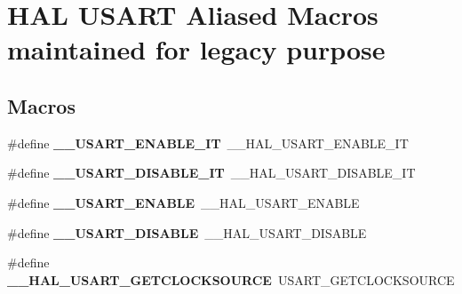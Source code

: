 \hypertarget{group___h_a_l___u_s_a_r_t___aliased___macros}{\section{H\-A\-L U\-S\-A\-R\-T Aliased Macros maintained for legacy purpose}
\label{group___h_a_l___u_s_a_r_t___aliased___macros}
}
\subsection*{Macros}
\begin{DoxyCompactItemize}
\item 
\hypertarget{group___h_a_l___u_s_a_r_t___aliased___macros_gab99081ba6bb70f397ab2def3f644c3c1}{\#define {\bfseries \-\_\-\-\_\-\-U\-S\-A\-R\-T\-\_\-\-E\-N\-A\-B\-L\-E\-\_\-\-I\-T}~\-\_\-\-\_\-\-H\-A\-L\-\_\-\-U\-S\-A\-R\-T\-\_\-\-E\-N\-A\-B\-L\-E\-\_\-\-I\-T}\label{group___h_a_l___u_s_a_r_t___aliased___macros_gab99081ba6bb70f397ab2def3f644c3c1}

\item 
\hypertarget{group___h_a_l___u_s_a_r_t___aliased___macros_ga12ae7c59b7d95f0f8606fca7bba57db8}{\#define {\bfseries \-\_\-\-\_\-\-U\-S\-A\-R\-T\-\_\-\-D\-I\-S\-A\-B\-L\-E\-\_\-\-I\-T}~\-\_\-\-\_\-\-H\-A\-L\-\_\-\-U\-S\-A\-R\-T\-\_\-\-D\-I\-S\-A\-B\-L\-E\-\_\-\-I\-T}\label{group___h_a_l___u_s_a_r_t___aliased___macros_ga12ae7c59b7d95f0f8606fca7bba57db8}

\item 
\hypertarget{group___h_a_l___u_s_a_r_t___aliased___macros_gae03c01e0ee50608e887842bacbf5b361}{\#define {\bfseries \-\_\-\-\_\-\-U\-S\-A\-R\-T\-\_\-\-E\-N\-A\-B\-L\-E}~\-\_\-\-\_\-\-H\-A\-L\-\_\-\-U\-S\-A\-R\-T\-\_\-\-E\-N\-A\-B\-L\-E}\label{group___h_a_l___u_s_a_r_t___aliased___macros_gae03c01e0ee50608e887842bacbf5b361}

\item 
\hypertarget{group___h_a_l___u_s_a_r_t___aliased___macros_gac894c090835b348469f36bfed6e78fbd}{\#define {\bfseries \-\_\-\-\_\-\-U\-S\-A\-R\-T\-\_\-\-D\-I\-S\-A\-B\-L\-E}~\-\_\-\-\_\-\-H\-A\-L\-\_\-\-U\-S\-A\-R\-T\-\_\-\-D\-I\-S\-A\-B\-L\-E}\label{group___h_a_l___u_s_a_r_t___aliased___macros_gac894c090835b348469f36bfed6e78fbd}

\item 
\hypertarget{group___h_a_l___u_s_a_r_t___aliased___macros_ga0ed768f9a18f877413306078c442a2a5}{\#define {\bfseries \-\_\-\-\_\-\-H\-A\-L\-\_\-\-U\-S\-A\-R\-T\-\_\-\-G\-E\-T\-C\-L\-O\-C\-K\-S\-O\-U\-R\-C\-E}~U\-S\-A\-R\-T\-\_\-\-G\-E\-T\-C\-L\-O\-C\-K\-S\-O\-U\-R\-C\-E}\label{group___h_a_l___u_s_a_r_t___aliased___macros_ga0ed768f9a18f877413306078c442a2a5}


\end{DoxyCompactItemize}
